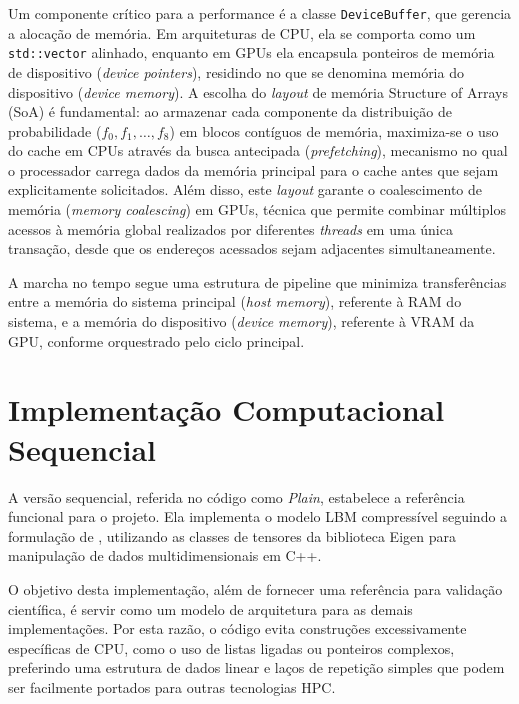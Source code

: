 Um componente crítico para a performance é a classe \texttt{DeviceBuffer}, que gerencia a alocação de memória.
Em arquiteturas de CPU, ela se comporta como um \texttt{std::vector} alinhado, enquanto em GPUs ela encapsula ponteiros de memória de dispositivo (\textit{device pointers}), residindo no que se denomina memória do dispositivo (\textit{device memory}). A escolha do \textit{layout} de memória Structure of Arrays (SoA) é fundamental: ao armazenar cada componente da distribuição de probabilidade ($f_0, f_1, \dots, f_8$) em blocos contíguos de memória, maximiza-se o uso do cache em CPUs através da busca antecipada (\textit{prefetching}), mecanismo no qual o processador carrega dados da memória principal para o cache antes que sejam explicitamente solicitados.
Além disso, este \textit{layout} garante o coalescimento de memória (\textit{memory coalescing}) em GPUs, técnica que permite combinar múltiplos acessos à memória global realizados por diferentes \textit{threads} em uma única transação, desde que os endereços acessados sejam adjacentes simultaneamente.

A marcha no tempo segue uma estrutura de pipeline que minimiza transferências entre a memória do sistema principal (\textit{host memory}), referente à RAM do sistema, e a memória do dispositivo (\textit{device memory}), referente à VRAM da GPU, conforme orquestrado pelo ciclo principal.

\section{Implementação Computacional Sequencial}\label{sec:implementacao-computacional-sequencial}

A versão sequencial, referida no código como \textit{Plain}, estabelece a referência funcional para o projeto.
Ela implementa o modelo LBM compressível seguindo a formulação de \textcite{Tran2022}, utilizando as classes de tensores da biblioteca Eigen para manipulação de dados multidimensionais em C++.

O objetivo desta implementação, além de fornecer uma referência para validação científica, é servir como um modelo de arquitetura para as demais implementações.
Por esta razão, o código evita construções excessivamente específicas de CPU, como o uso de listas ligadas ou ponteiros complexos, preferindo uma estrutura de dados linear e laços de repetição simples que podem ser facilmente portados para outras tecnologias HPC.

